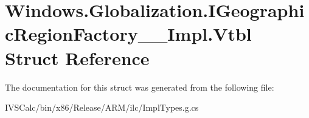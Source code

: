 \hypertarget{struct_windows_1_1_globalization_1_1_i_geographic_region_factory_____impl_1_1_vtbl}{}\section{Windows.\+Globalization.\+I\+Geographic\+Region\+Factory\+\_\+\+\_\+\+Impl.\+Vtbl Struct Reference}
\label{struct_windows_1_1_globalization_1_1_i_geographic_region_factory_____impl_1_1_vtbl}


The documentation for this struct was generated from the following file\+:\begin{DoxyCompactItemize}
\item 
I\+V\+S\+Calc/bin/x86/\+Release/\+A\+R\+M/ilc/Impl\+Types.\+g.\+cs\end{DoxyCompactItemize}
